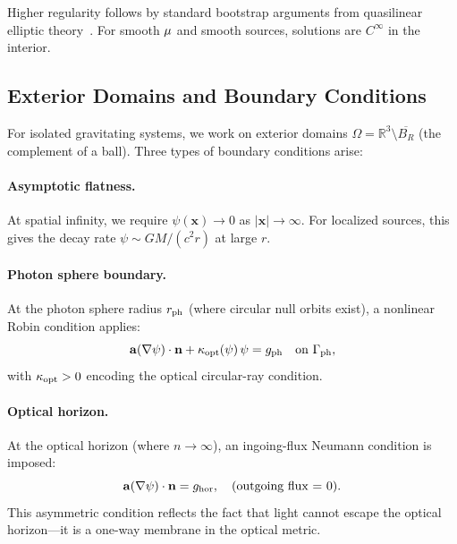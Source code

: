 Higher regularity follows by standard bootstrap arguments from quasilinear 
elliptic theory~\cite{GilbargTrudinger,LadyzhenskayaUraltseva}. For smooth 
$\mu$ and smooth sources, solutions are $C^\infty$ in the interior.

\subsection{Exterior Domains and Boundary Conditions}\label{sec:exterior}

For isolated gravitating systems, we work on exterior domains 
$\Omega = \mathbb{R}^3 \setminus \overline{B_R}$ (the complement of a ball). 
Three types of boundary conditions arise:

\paragraph{Asymptotic flatness.}
At spatial infinity, we require $\psi(\mathbf{x}) \to 0$ as 
$|\mathbf{x}| \to \infty$. For localized sources, this gives the 
decay rate $\psi \sim GM/(c^2 r)$ at large $r$.

\paragraph{Photon sphere boundary.}
At the photon sphere radius $r_{\rm ph}$ (where circular null orbits exist), 
a nonlinear Robin condition applies:
\begin{equation}
\mathbf{a}(\nabla\psi) \cdot \mathbf{n} + \kappa_{\rm opt}(\psi)\,\psi = g_{\rm ph}
\quad \text{on } \Gamma_{\rm ph},
\end{equation}
with $\kappa_{\rm opt} > 0$ encoding the optical circular-ray condition.

\paragraph{Optical horizon.}
At the optical horizon (where $n \to \infty$), an ingoing-flux 
Neumann condition is imposed:
\begin{equation}
\mathbf{a}(\nabla\psi) \cdot \mathbf{n} = g_{\rm hor}, 
\quad \text{(outgoing flux = 0)}.
\end{equation}
This asymmetric condition reflects the fact that light cannot escape 
the optical horizon---it is a one-way membrane in the optical metric.

